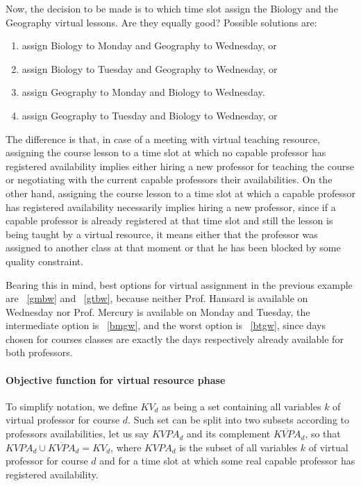 Now, the decision to be made is to which time slot assign the Biology and the Geography virtual lessons. Are they equally good? Possible solutions are:
\begin{enumerate}
\item assign Biology to Monday and Geography to Wednesday, or \label{bmgw}
\item assign Biology to Tuesday and Geography to Wednesday, or \label{btgw}
\item assign Geography to Monday and Biology to Wednesday. \label{gmbw}
\item assign Geography to Tuesday and Biology to Wednesday, or \label{gtbw}
\end{enumerate}

The difference is that, in case of a meeting with virtual teaching resource, assigning the course lesson to a time slot at which no capable professor has registered availability implies either hiring a new professor for teaching the course or negotiating with the current capable professors their availabilities. On the other hand, assigning the course lesson to a time slot at which a capable professor has registered availability necessarily implies hiring a new professor, since if a capable professor is already registered at that time slot and still the lesson is being taught by a virtual resource, it means either that the professor was assigned to another class at that moment or that he has been blocked by some quality constraint.

Bearing this in mind, best options for virtual assignment in the previous example are ~\ref{gmbw} and ~\ref{gtbw}, because neither Prof. Hansard is available on Wednesday nor Prof. Mercury is available on Monday and Tuesday, the intermediate option is ~\ref{bmgw}, and the worst option is ~\ref{btgw}, since days chosen for courses classes are exactly the days respectively already available for both professors.

\paragraph{Objective function for virtual resource phase}

To simplify notation, we define $KV_{d}$ as being a set containing all variables $k$ of virtual professor for course $d$. Such set can be split into two subsets according to professors availabilities, let us say $KVPA_{d}$ and its complement $\overline{KVPA}_{d}$, so that $KVPA_{d} \cup \overline{KVPA}_{d} = KV_d$, where $KVPA_{d}$ is the subset of all variables $k$ of virtual professor for course $d$ and for a time slot at which some real capable professor has registered availability.

